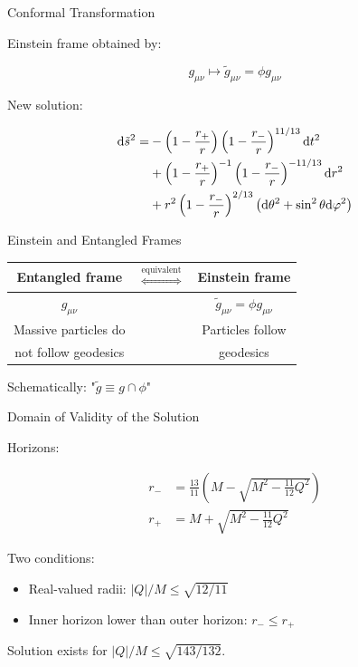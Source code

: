 \documentclass{beamer}
\newcommand{\paren}[1]{\left( #1 \right)}
\newcommand{\mrm}{\mathrm}
\begin{document}
\begin{frame}{Conformal Transformation}
    
    Einstein frame obtained by: %

    \begin{equation}
        g_{\mu\nu} \mapsto \tilde g_{\mu\nu} = \phi g_{\mu\nu} 
    \end{equation}

    New solution:

    \begin{align}
        \mrm d\tilde s^2 = &-\paren{1 - \frac{r_+}{r}}\paren{1 - \frac{r_-}{r}}^{11/13}\mrm dt^2 \notag\\
        &+ \paren{1 - \frac{r_+}{r}}^{-1}\paren{1 - \frac{r_-}{r}}^{-11/13}\mrm dr^2 \notag\\
        &+ r^2\paren{1 - \frac{r_-}{r}}^{2/13}\paren{\mrm d\theta^2 + \sin^2\theta \mrm d\varphi^2}
    \end{align}
\end{frame}

\begin{frame}{Einstein and Entangled Frames}
    \begin{center}
        
    \begin{tabular}{ccc}
        Entangled frame & $\overset{\mrm{equivalent}}{\iff}$ & Einstein frame \\
        \hline
        $g_{\mu\nu}$ & & $\tilde g_{\mu\nu} = \phi g_{\mu\nu}$\\
        \hline
        Massive particles do & & Particles follow \\
        not follow geodesics & & geodesics
    \end{tabular}

    \end{center}

    \vspace{20pt}

    Schematically: "$\tilde g \equiv g \cap \phi$"
\end{frame}

\begin{frame}{Domain of Validity of the Solution}

    Horizons:

    \begin{align}
        r_- &= \frac{13}{11}\paren{M - \sqrt{M^2 - \frac{11}{12}Q^2}}\\
        r_+ &= M + \sqrt{M^2 - \frac{11}{12}Q^2}
    \end{align}

    Two conditions:
    \begin{itemize}
        \item Real-valued radii: $|Q|/M \leq \sqrt{12/11}$
        \item Inner horizon lower than outer horizon: $r_- \leq r_+$
    \end{itemize}

    Solution exists for $|Q|/M \leq \sqrt{143/132}$.
    
\end{frame}
\end{document}

